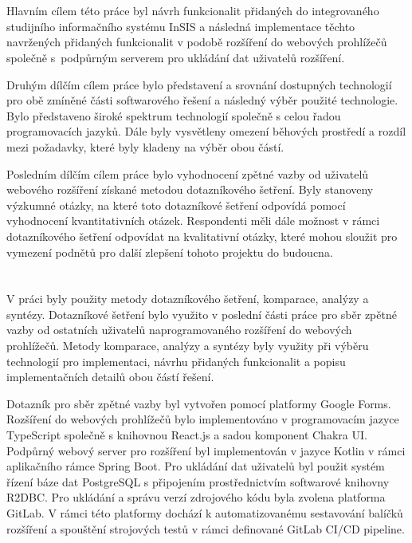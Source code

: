 \section*{\CilPrace}

Hlavním cílem této práce byl návrh funkcionalit přidaných do integrovaného studijního informačního systému InSIS a následná implementace těchto navržených přidaných funkcionalit v podobě rozšíření do webových prohlížečů společně s~podpůrným serverem pro ukládání dat uživatelů rozšíření. 

Druhým dílčím cílem práce bylo představení a srovnání dostupných technologií pro obě zmíněné části softwarového řešení a následný výběr použité technologie. Bylo představeno široké spektrum technologií společně s celou řadou programovacích jazyků. Dále byly vysvětleny omezení běhových prostředí a rozdíl mezi požadavky, které byly kladeny na výběr obou částí.  

Posledním dílčím cílem práce bylo vyhodnocení zpětné vazby od uživatelů webového rozšíření získané metodou dotazníkového šetření. Byly stanoveny výzkumné otázky, na které toto dotazníkové šetření odpovídá pomocí vyhodnocení kvantitativních otázek. Respondenti měli dále možnost v rámci dotazníkového šetření odpovídat na kvalitativní otázky, které mohou sloužit pro vymezení podnětů pro další zlepšení tohoto projektu do budoucna. 

\section*{\PouziteMetody}

V práci byly použity metody dotazníkového šetření, komparace, analýzy a syntézy. Dotazníkové šetření bylo využito v poslední části práce pro sběr zpětné vazby od ostatních uživatelů naprogramovaného rozšíření do webových prohlížečů. Metody komparace, analýzy a syntézy byly využity při výběru technologií pro implementaci, návrhu přidaných funkcionalit a popisu implementačních detailů obou částí řešení.    

Dotazník pro sběr zpětné vazby byl vytvořen pomocí platformy Google Forms. Rozšíření do webových prohlížečů bylo implementováno v programovacím jazyce TypeScript společně s knihovnou React.js a sadou komponent Chakra UI. Podpůrný webový server pro rozšíření byl implementován v jazyce Kotlin v rámci aplikačního rámce Spring Boot. Pro ukládání dat uživatelů byl použit systém řízení báze dat PostgreSQL s připojením prostřednictvím softwarové knihovny R2DBC. Pro ukládání a správu verzí zdrojového kódu byla zvolena platforma GitLab. V rámci této platformy dochází k automatizovanému sestavování balíčků rozšíření a spouštění strojových testů v rámci definované GitLab CI/CD pipeline.

